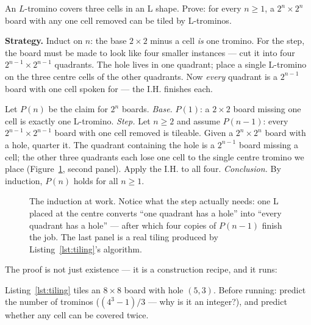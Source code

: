\begin{example}\label{ex:tromino}
An $L$-tromino covers three cells in an L shape. Prove: for every $n \ge 1$,
a $2^n \times 2^n$ board with any one cell removed can be tiled by L-trominos.
\par\smallskip
\textbf{Strategy.} Induct on $n$: the base $2 \times 2$ minus a cell \emph{is}
one tromino. For the step, the board must be made to look like four smaller
instances --- cut it into four $2^{n-1} \times 2^{n-1}$ quadrants. The hole
lives in one quadrant; place a single L-tromino on the three centre cells of
the other quadrants. Now \emph{every} quadrant is a $2^{n-1}$ board with one
cell spoken for --- the I.H. finishes each.
\par\smallskip
\begin{solution}
Let $P(n)$ be the claim for $2^n$ boards. \emph{Base.} $P(1)$: a $2 \times 2$
board missing one cell is exactly one L-tromino. \emph{Step.} Let $n \ge 2$
and assume $P(n-1)$: every $2^{n-1} \times 2^{n-1}$ board with one cell
removed is tileable. Given a $2^n \times 2^n$ board with a hole, quarter it.
The quadrant containing the hole is a $2^{n-1}$ board missing a cell; the
other three quadrants each lose one cell to the single centre tromino we place
(Figure~\ref{fig:tromino}, second panel). Apply the I.H. to all four.
\emph{Conclusion.} By induction, $P(n)$ holds for all $n \ge 1$.
\end{solution}
\end{example}

\begin{figure}[ht]\centering

\caption{The induction at work. Notice what the step actually needs: one L
placed at the centre converts ``one quadrant has a hole'' into ``every quadrant
has a hole'' --- after which four copies of $P(n-1)$ finish the job. The last
panel is a real tiling produced by Listing~\ref{lst:tiling}'s algorithm.}
\label{fig:tromino}
\end{figure}

The proof is not just existence --- it is a construction recipe, and it runs:

\begin{checkpoint}
Listing~\ref{lst:tiling} tiles an $8 \times 8$ board with hole $(5,3)$. Before
running: predict the number of trominos ($(4^3 - 1)/3$ --- why is it an
integer?), and predict whether any cell can be covered twice.
\end{checkpoint}

